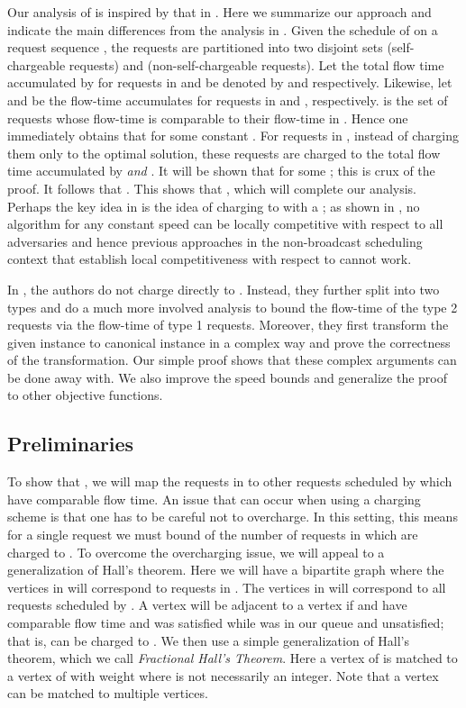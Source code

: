 \documentclass[11pt]{article}
\newcommand{\spone}{-3.5mm}
\begin{document}
\begin{titlepage}
Our analysis of  is inspired by that in \cite{EdmondsP04}.  Here we summarize our approach and indicate the main
differences from the analysis in \cite{EdmondsP04}. Given the schedule of  on a request sequence , the
requests are partitioned into two disjoint sets  (self-chargeable requests) and  (non-self-chargeable requests).
Let the total flow time accumulated by  for requests in  and  be denoted by  and 
respectively. Likewise, let  and  be the flow-time  accumulates for requests in  and ,
respectively.  is the set of requests whose flow-time is comparable to their flow-time in . Hence one
immediately obtains that  for some constant .  For requests in , instead of
charging them only to the optimal solution, these requests are charged to the total flow time accumulated by 
{\em
  and} . It will be shown that  for some ; this is crux of the proof. It follows that . This shows that , which will complete our analysis. Perhaps the key idea in \cite{EdmondsP04} is the idea of
charging  to  with a ; as shown in \cite{KalyanasundaramPV00}, no algorithm for any
constant speed can be locally competitive with respect to all adversaries and hence previous approaches in the
non-broadcast scheduling context that establish local competitiveness with respect to  cannot work.

In \cite{EdmondsP04}, the authors do not charge  directly to . Instead, they further split  into
two types and do a much more involved analysis to bound the flow-time of the type 2 requests via the flow-time of type
1 requests. Moreover, they first transform the given instance to canonical instance in a complex way and prove the
correctness of the transformation. Our simple proof shows that these complex arguments can be done away with. We also
improve the speed bounds and generalize the proof to other objective functions. \vspace{\spone}

\subsection{Preliminaries}
To show that , we will map the requests in  to other requests scheduled
by  which have comparable flow time.  An issue that can occur when using a charging scheme is that one has to
be careful not to overcharge.  In this setting, this means for a single request  we must bound of the number
of requests in  which are charged to .  To overcome the overcharging issue, we will appeal to a
generalization of Hall's theorem.  Here we will have a bipartite graph  where the vertices in  will
correspond to requests in .  The vertices in  will correspond to all requests scheduled by .  A vertex  will be adjacent to a vertex  if  and  have comparable flow time and  was satisfied while 
was in our queue and unsatisfied; that is,  can be charged to .  We then use a simple generalization of Hall's
theorem, which we call \emph{Fractional Hall's Theorem}. Here a vertex of  is matched to a vertex of 
with weight  where  is not necessarily an integer. Note that a vertex can be matched to
multiple vertices.
\vspace{-2mm}


\end{titlepage}
\end{document}
